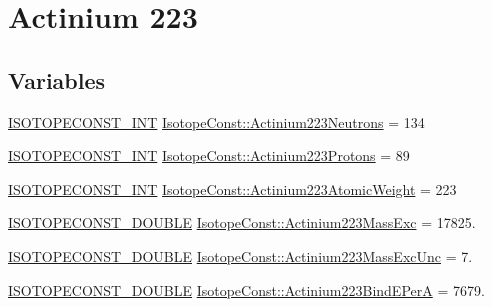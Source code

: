 \hypertarget{group___isotope_const-_actinium-_ac223}{}\section{Actinium 223}
\label{group___isotope_const-_actinium-_ac223}
\subsection*{Variables}
\begin{DoxyCompactItemize}
\item 
\mbox{\hyperlink{group___isotope_const-_macros_ga5f18360b3e99483a35c32d789e62621c}{I\+S\+O\+T\+O\+P\+E\+C\+O\+N\+S\+T\+\_\+\+I\+NT}} \mbox{\hyperlink{group___isotope_const-_actinium-_ac223_ga343927a46667f01b015197754ee1f144}{Isotope\+Const\+::\+Actinium223\+Neutrons}} = 134
\item 
\mbox{\hyperlink{group___isotope_const-_macros_ga5f18360b3e99483a35c32d789e62621c}{I\+S\+O\+T\+O\+P\+E\+C\+O\+N\+S\+T\+\_\+\+I\+NT}} \mbox{\hyperlink{group___isotope_const-_actinium-_ac223_gacc7bc82acb47b77a9cfbb102fde35ecb}{Isotope\+Const\+::\+Actinium223\+Protons}} = 89
\item 
\mbox{\hyperlink{group___isotope_const-_macros_ga5f18360b3e99483a35c32d789e62621c}{I\+S\+O\+T\+O\+P\+E\+C\+O\+N\+S\+T\+\_\+\+I\+NT}} \mbox{\hyperlink{group___isotope_const-_actinium-_ac223_ga47d1d81bb29919d2b04632c4ff8f46aa}{Isotope\+Const\+::\+Actinium223\+Atomic\+Weight}} = 223
\item 
\mbox{\hyperlink{group___isotope_const-_macros_ga8f45a7272ce02c0b4c65c44636ed719a}{I\+S\+O\+T\+O\+P\+E\+C\+O\+N\+S\+T\+\_\+\+D\+O\+U\+B\+LE}} \mbox{\hyperlink{group___isotope_const-_actinium-_ac223_gac3b2fa2903b63a42db4fc6557bb0b949}{Isotope\+Const\+::\+Actinium223\+Mass\+Exc}} = 17825.
\item 
\mbox{\hyperlink{group___isotope_const-_macros_ga8f45a7272ce02c0b4c65c44636ed719a}{I\+S\+O\+T\+O\+P\+E\+C\+O\+N\+S\+T\+\_\+\+D\+O\+U\+B\+LE}} \mbox{\hyperlink{group___isotope_const-_actinium-_ac223_ga3d2d4743d5c938576c0a7bb7bd2011c1}{Isotope\+Const\+::\+Actinium223\+Mass\+Exc\+Unc}} = 7.
\item 
\mbox{\hyperlink{group___isotope_const-_macros_ga8f45a7272ce02c0b4c65c44636ed719a}{I\+S\+O\+T\+O\+P\+E\+C\+O\+N\+S\+T\+\_\+\+D\+O\+U\+B\+LE}} \mbox{\hyperlink{group___isotope_const-_actinium-_ac223_ga324bafb4242da5a795abe27a9f7b0014}{Isotope\+Const\+::\+Actinium223\+Bind\+E\+PerA}} = 7679.
\item 

\end{DoxyCompactItemize}
